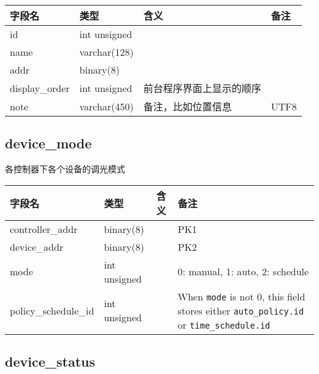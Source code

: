 \begin{longtabu}[c]{@{}lXXX@{}}
\toprule
字段名 & 类型 & 含义 & 备注\tabularnewline
\midrule
\endhead
id & int unsigned & &\tabularnewline
name & varchar(128) & &\tabularnewline
addr & binary(8) & &\tabularnewline
display\_order & int unsigned & 前台程序界面上显示的顺序
&\tabularnewline
note & varchar(450) & 备注，比如位置信息 & UTF8\tabularnewline
\bottomrule
\end{longtabu}

\subsection{device\_mode}\label{deviceux5fmode}

各控制器下各个设备的调光模式

\begin{longtabu}[c]{@{}lXXX@{}}
\toprule
字段名 & 类型 & 含义 & 备注\tabularnewline
\midrule
\endhead
controller\_addr & binary(8) & & PK1\tabularnewline
device\_addr & binary(8) & & PK2\tabularnewline
mode & int unsigned & & 0: manual, 1: auto, 2: schedule\tabularnewline
policy\_schedule\_id & int unsigned & & When \texttt{mode} is not 0,
this field stores either \texttt{auto\_policy.id} or
\texttt{time\_schedule.id}\tabularnewline
\bottomrule
\end{longtabu}

\subsection{device\_status}\label{deviceux5fstatus}

